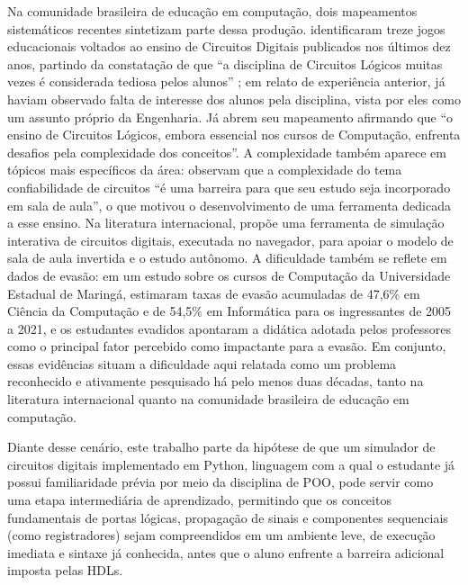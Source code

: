 Na comunidade brasileira de educação em computação, dois mapeamentos sistemáticos recentes sintetizam parte dessa produção.  identificaram treze jogos educacionais voltados ao ensino de Circuitos Digitais publicados nos últimos dez anos, partindo da constatação de que ``a disciplina de Circuitos Lógicos muitas vezes é considerada tediosa pelos alunos'' \cite[p.~814]{santini2023}; em relato de experiência anterior,  já haviam observado falta de interesse dos alunos pela disciplina, vista por eles como um assunto próprio da Engenharia. Já  abrem seu mapeamento afirmando que ``o ensino de Circuitos Lógicos, embora essencial nos cursos de Computação, enfrenta desafios pela complexidade dos conceitos''. A complexidade também aparece em tópicos mais específicos da área:  observam que a complexidade do tema confiabilidade de circuitos ``é uma barreira para que seu estudo seja incorporado em sala de aula'', o que motivou o desenvolvimento de uma ferramenta dedicada a esse ensino. Na literatura internacional,  propõe uma ferramenta de simulação interativa de circuitos digitais, executada no navegador, para apoiar o modelo de sala de aula invertida e o estudo autônomo. A dificuldade também se reflete em dados de evasão: em um estudo sobre os cursos de Computação da Universidade Estadual de Maringá,  estimaram taxas de evasão acumuladas de 47,6\% em Ciência da Computação e de 54,5\% em Informática para os ingressantes de 2005 a 2021, e os estudantes evadidos apontaram a didática adotada pelos professores como o principal fator percebido como impactante para a evasão. Em conjunto, essas evidências situam a dificuldade aqui relatada como um problema reconhecido e ativamente pesquisado há pelo menos duas décadas, tanto na literatura internacional quanto na comunidade brasileira de educação em computação.

Diante desse cenário, este trabalho parte da hipótese de que um simulador de circuitos digitais implementado em Python, linguagem com a qual o estudante já possui familiaridade prévia por meio da disciplina de POO, pode servir como uma etapa intermediária de aprendizado, permitindo que os conceitos fundamentais de portas lógicas, propagação de sinais e componentes sequenciais (como registradores) sejam compreendidos em um ambiente leve, de execução imediata e sintaxe já conhecida, antes que o aluno enfrente a barreira adicional imposta pelas HDLs.

